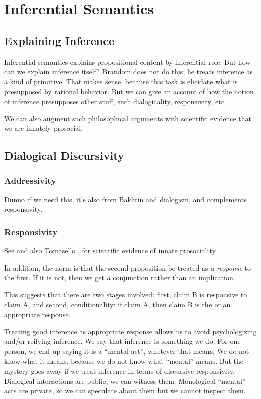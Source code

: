 \documentclass{article}
\begin{document}
\section{Inferential Semantics}

\subsection{Explaining Inference}

Inferential semantics explains propositional content by inferential
role. But how can we explain inference itself? Brandom does not do
this; he treats inference as a kind of primitive. That makes sense,
because this task is elicidate what is presupposed by rational
behavior. But we can give an account of how the notion of inference
presupposes other stuff, such dialogicality, responsivity, etc.

We can also augment such philosophical arguments with scientific
evidence that we are innately prosocial.

\subsection{Dialogical Discursivity}

\subsubsection{Addressivity}

Dunno if we need this, it's also from Bakhtin and dialogism, and
complements responsivity.

\subsubsection{Responsivity}

See \parencite{bakhtin_problem_1986} and also Tomasello
\parencite{tomasello2009we}, \parencite{tomasello_origins_2010} for
scientific evidence of innate prosociality.

In addition, the norm is that the second proposition be treated as a
\textit{response} to the first. If it is not, then we get a
conjunction rather than an implication.

This suggests that there are two stages involved: first, claim B is
responsive to claim A, and second, conditionality: if claim A, then
claim B is the or an appropriate response.

Treating good inference as appropriate response allows us to avoid
psychologizing and/or reifying inference. We say that inference is
something we do. For one person, we end up saying it is a ``mental
act'', whetever that means. We do not know what it means, because we
do not know what ``mental'' means. But the mystery goes away if we
treat inference in terms of discursive responsivity. Dialogical
interactions are public; we can witness them. Monological ``mental''
acts are private, so we can speculate about them but we cannot inspect
them.
\end{document}
